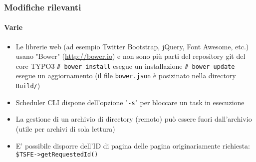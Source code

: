 \begin{frame}[fragile]
	\frametitle{Modifiche rilevanti}
	\framesubtitle{Varie}

	\begin{itemize}

		\item Le librerie web (ad esempio Twitter Bootstrap, jQuery, Font Awesome, etc.) usano
			"Bower" (\url{http://bower.io}) e non sono più parti del repository git del core TYPO3\newline
			\small
				\texttt{\# bower install}	\tabto{3.4cm}esegue un installazione\newline
				\texttt{\# bower update}		\tabto{3.4cm}esegue un aggiornamento\newline
			\normalsize
			(il file \texttt{bower.json} è posizinato nella directory \texttt{Build/})

		\item Scheduler CLI dispone dell'opzione "\texttt{-s}" per bloccare un task in esecuzione

		\item La gestione di un archivio di directory (remoto) può essere fuori dall'archivio
			(utile per archivi di sola lettura)

		\item E' possibile disporre dell'ID di pagina delle pagina originariamente richiesta:
			\texttt{\$TSFE->getRequestedId()}

	\end{itemize}

\end{frame}

